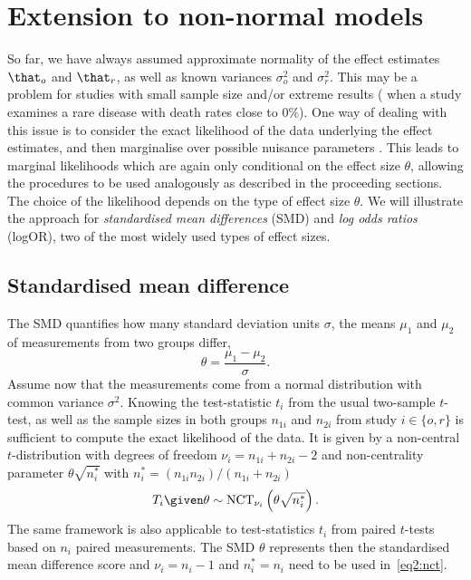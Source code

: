 \section{Extension to non-normal models} \label{sec2:tdist}
So far, we have always assumed approximate normality of the effect estimates
$\that_o$ and $\that_r$, as well as known variances $\sigma^2_o$ and
$\sigma^2_r$. This may be a problem for studies with small sample size and/or
extreme results (\eg{} when a study examines a rare disease with death rates close
to 0\%). One way of dealing with this issue is to consider the exact likelihood
of the data underlying the effect estimates, and then marginalise over possible
nuisance parameters \citep[chapter 8.2.2]{Spiegelhalter2004}. This leads to
marginal likelihoods which are again only conditional on the effect size
$\theta$, allowing the procedures to be used analogously as described in the
proceeding sections. The choice of the likelihood depends on the type of effect
size $\theta$. We will illustrate the approach for \emph{standardised mean
differences} (SMD) and \emph{log odds ratios} (logOR), two of the most widely
used types of effect sizes.

\subsection{Standardised mean difference}
The SMD quantifies how many standard deviation units $\sigma$, the means $\mu_1$
and $\mu_2$ of measurements from two groups differ, \ie{}
$$\theta = \frac{\mu_1 - \mu_2}{\sigma}.$$
Assume now that the measurements come from a normal distribution with common
variance $\sigma^2$. Knowing the test-statistic $t_i$ from the usual two-sample
$t$-test, as well as the sample sizes in both groups $n_{1i}$ and $n_{2i}$ from
study $i \in \{o, r\}$ is sufficient to compute the exact likelihood of the
data. It is given by a non-central $t$-distribution with degrees of freedom
$\nu_i = n_{1i} + n_{2i} - 2$ and non-centrality parameter $\theta \sqrt{n^*_i}$
with $n^*_i = (n_{1i}n_{2i})/(n_{1i} + n_{2i})$ \citep{Bayarri2002}
\begin{align}
  \label{eq2:nct}
  T_i \given \theta \sim \text{NCT}_{\nu_i} \left(\theta \sqrt{n^*_i}\right).
\end{align}
The same framework is also applicable to test-statistics $t_{i}$ from paired
$t$-tests based on $n_{i}$ paired measurements. The SMD $\theta$ represents then
the standardised mean difference score and $\nu_{i} = n_{i} - 1$ and
$n_{i}^{*} = n_{i}$ need to be used in~\eqref{eq2:nct}.


